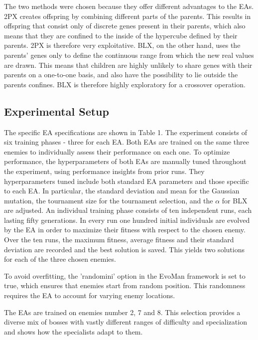 The two methods were chosen because they offer different advantages to the EAs.
2PX creates offspring by combining different parts of the parents.
This results in offspring that consist only of discrete genes present in their parents, which also means that they are confined to the inside of the hypercube defined by their parents.
2PX is therefore very exploitative.
BLX, on the other hand, uses the parents' genes only to define the continuous range from which the new real values are drawn.
This means that children are highly unlikely to share genes with their parents on a one-to-one basis, and also have the possibility to lie outside the parents confines.
BLX is therefore highly exploratory for a crossover operation.

\subsection{Experimental Setup}

The specific EA specifications are shown in Table 1.
The experiment consists of six training phases - three for each EA.
Both EAs are trained on the same three enemies to individually assess their performance on each one.
To optimize performance, the hyperparameters of both EAs are manually tuned throughout the experiment, using performance insights from prior runs.
They hyperparameters tuned include both standard EA parameters and those specific to each EA.
In particular, the standard deviation and mean for the Gaussian mutation, the tournament size for the tournament selection, and the $\alpha$ for BLX are adjusted.
An individual training phase consists of ten independent runs, each lasting fifty generations.
In every run one hundred initial individuals are evolved by the EA in order to maximize their fitness with respect to the chosen enemy.
Over the ten runs, the maximum fitness, average fitness and their standard deviation are recorded and the best solution is saved.
This yields two solutions for each of the three chosen enemies.

To avoid overfitting, the 'randomini' option in the EvoMan framework is set to true, which ensures that enemies start from random position.
This randomness requires the EA to account for varying enemy locations.

The EAs are trained on enemies number 2, 7 and 8.
This selection provides a diverse mix of bosses with vastly different ranges of difficulty and specialization and shows how the specialists adapt to them.

